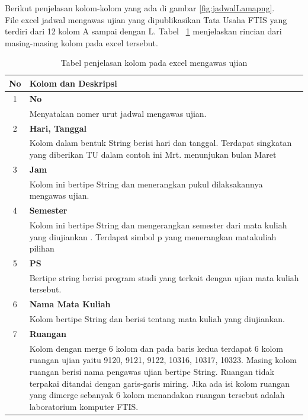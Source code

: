Berikut penjelasan kolom-kolom yang ada di gambar \ref{fig:jadwalLamapng}.\\
File excel jadwal mengawas ujian yang dipublikasikan Tata Usaha FTIS yang terdiri dari 12 kolom A sampai dengan L.
Tabel ~\ref{tab:penjelasan_kolom} menjelaskan rincian dari masing-masing kolom pada excel tersebut. 
\begin{table}[H]
		\centering
		\caption{Tabel penjelasan kolom pada excel mengawas ujian}
		\label{tab:penjelasan_kolom}
\begin{tabular}{|c|p{12cm}|}
		\hline
		\textbf{No} & \textbf{Kolom dan Deskripsi} \\ \hline \hline
		1 & \textbf{No}\\
			&	Menyatakan nomer urut jadwal mengawas ujian.\\ \hline
		2 & \textbf{Hari, Tanggal}\\
			&	Kolom dalam bentuk String berisi hari dan tanggal. Terdapat singkatan yang diberikan TU dalam contoh ini  Mrt. menunjukan bulan Maret\\ \hline	
		3 & \textbf{Jam}\\
			&	Kolom ini bertipe String dan menerangkan pukul dilaksakannya mengawas ujian.\\ \hline
		4 & \textbf{Semester}\\
			&	Kolom ini bertipe String dan mengerangkan semester dari mata kuliah yang diujiankan . Terdapat simbol p yang menerangkan matakuliah pilihan\\ \hline
		5 & \textbf{PS}\\
			&	Bertipe string berisi program studi yang terkait dengan ujian mata kuliah tersebut.\\ \hline
		6 & \textbf{Nama Mata Kuliah}\\
			&	Kolom bertipe String dan berisi tentang mata kuliah yang diujiankan.\\ \hline
		7 & \textbf{Ruangan}\\
			&	Kolom dengan merge 6 kolom dan pada baris kedua terdapat 6 kolom ruangan ujian yaitu 9120, 9121, 9122, 10316, 10317, 10323. Masing kolom ruangan berisi nama pengawas ujian bertipe String. Ruangan tidak terpakai ditandai dengan garis-garis miring. Jika ada isi kolom ruangan yang dimerge sebanyak 6 kolom menandakan ruangan tersebut adalah laboratorium komputer FTIS.\\ \hline
	\end{tabular}	
\end{table}

